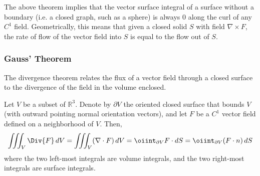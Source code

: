   The above theorem implies that the vector surface integral of a surface without a boundary (i.e. a closed graph, such as a sphere) is always $0$ along the curl of any $C^1$ field. Geometrically, this means that given a closed solid $S$ with field $\nabla \times F$, the rate of flow of the vector field into $S$ is equal to the flow out of $S$. 

\subsubsection{Gauss' Theorem}

  The divergence theorem relates the flux of a vector field through a closed surface to the divergence of the field in the volume enclosed. 

  \begin{theorem}
		Let $V$ be a subset of $\mathbb{R}^3$. Denote by $\partial V$ the oriented closed surface that bounds $V$ (with outward pointing normal orientation vectors), and let $F$ be a $C^1$ vector field defined on a neighborhood of $V$. Then, 
		\begin{equation}
			\iiint_V \Div{F} \, d V = \iiint_V (\nabla \cdot F) \, d V = \oiint_{\partial V} F \cdot d S = \oiint_{\partial V} (F \cdot n) \, dS
		\end{equation}
		where the two left-most integrals are volume integrals, and the two right-most integrals are surface integrals. 

		\begin{figure}[H]
			\centering 
\end{figure}
\end{theorem}
